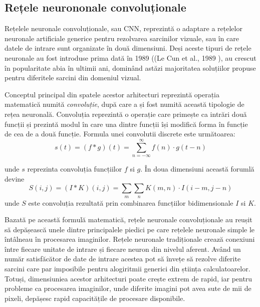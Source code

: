 \documentclass[a4paper,12pt]{book}
\begin{document}
			\subsection{Rețele neurononale convoluționale} \label{cnns}
				Rețelele neuronale convoluționale, sau CNN, reprezintă o adaptare a rețelelor neuronale artificiale generice pentru rezolvarea sarcinilor vizuale, sau în care datele de intrare sunt organizate în două dimensiuni. Deși aceste tipuri de rețele neuronale au fost introduse prima dată în 1989 ((Le Cun et al., 1989 \cite{leCun}), au crescut în popularitate abia în ultimii ani, dominând astăzi majoritatea soluțiilor propuse pentru diferitele sarcini din domeniul vizual. \par 
				Conceptul principal din spatele acestor arhitecturi reprezintă operația matematică numită \textit{convoluție}, după care a și fost numită această tipologie de rețea neuronală. Convoluția reprezintă o operație care primește ca intrări două funcții și prezintă modul în care una dintre funcții își modifică forma în funcție de cea de a două funcție. Formula unei convolutii discrete este următoarea:
				\begin{equation*}
					s(t) = (f*g)(t) = \sum_{n=-\infty}^{\infty} f(n) \cdot g(t - n)
				\end{equation*}	\par
				unde $s$ reprezinta convoluția funcțiilor $f$ si $g$.
				\noindent În doua dimensiuni această forumlă devine
				\begin{equation}\label{convo}				
					S(i, j) = (I*K)(i, j) = \sum_{m} \sum_{n} K(m, n) \cdot I(i - m, j - n)
				\end{equation}
				unde $S$ este convoluția rezultată prin combinarea funcțiilor bidimensionale $I$ si $K$.\par
				Bazată pe această formulă matematică, rețele neuronale convoluționale au reușit să depășească unele dintre principalele piedici pe care rețelele neuronale simple le întâlneau în procesarea imaginilor. Rețele neuronale tradiționale crează conexiuni între fiecare unitate de intrare și fiecare neuron din nivelul aferent. Având un număr satisfăcător de date de intrare acestea pot să învețe să rezolve diferite sarcini care par imposibile pentru alogiritmii generici din știința calculatoarelor. Totuși, dimensiuniea acestor arhitecturi poate crește extrem de rapid, iar pentru probleme ca procesarea imaginilor, unde diferite imagini pot avea sute de mii de pixeli, depășesc rapid capacitățile de procesare disponibile. \par
				
\end{document}
